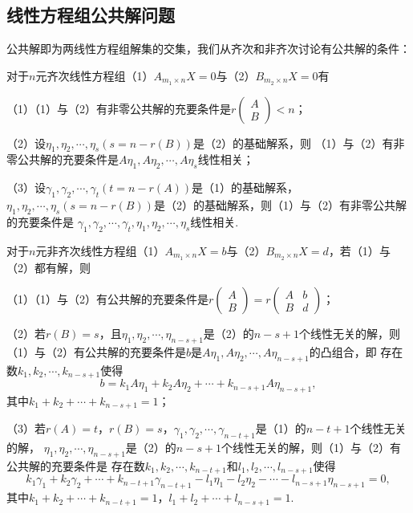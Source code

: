 \subsection{线性方程组公共解问题}
公共解即为两线性方程组解集的交集，我们从齐次和非齐次讨论有公共解的条件：
\begin{theorem}
	对于$n$元齐次线性方程组\textup{（1）}$A_{m_1 \times n}X=0$与\textup{（2）}$B_{m_2 \times n}X=0$有

	\textup{（1）}\textup{（1）}与\textup{（2）}有非零公共解的充要条件是$r\begin{pmatrix}
			A \\ B
		\end{pmatrix}<n$\textup{；}

	\textup{（2）}设$\eta_1,\eta_2,\cdots,\eta_s(s=n-r(B))$是\textup{（2）}的基础解系，则
	\textup{（1）}与\textup{（2）}有非零公共解的充要条件是$A\eta_1,A\eta_2,\cdots,A\eta_s$线性相关\textup{；}

	\textup{（3）}设$\gamma_1,\gamma_2,\cdots,\gamma_t(t=n-r(A))$是\textup{（1）}的基础解系，
	$\eta_1,\eta_2,\cdots,\eta_s(s=n-r(B))$是\textup{（2）}的基础解系，则\textup{（1）}与\textup{（2）}有非零公共解的充要条件是
	$\gamma_1,\gamma_2,\cdots,\gamma_t,\eta_1,\eta_2,\cdots,\eta_s$线性相关.
\end{theorem}
\begin{theorem}
	对于$n$元非齐次线性方程组\textup{（1）}$A_{m_1 \times n}X=b$与\textup{（2）}$B_{m_2 \times n}X=d$，若\textup{（1）}与\textup{（2）}都有解，则

	\textup{（1）}\textup{（1）}与\textup{（2）}有公共解的充要条件是$r\begin{pmatrix}
			A \\ B
		\end{pmatrix}=r\begin{pmatrix}
			A & b \\ B & d
		\end{pmatrix}$\textup{；}

	\textup{（2）}若$r(B)=s$，且$\eta_1,\eta_2,\cdots,\eta_{n-s+1}$是\textup{（2）}的$n-s+1$个线性无关的解，则
	\textup{（1）}与\textup{（2）}有公共解的充要条件是$b$是$A\eta_1,A\eta_2,\cdots,A\eta_{n-s+1}$的凸组合，即
	存在数$k_1,k_2,\cdots,k_{n-s+1}$使得
	$$b=k_1A\eta_1+k_2A\eta_2+\cdots+k_{n-s+1}A\eta_{n-s+1},$$
	其中$k_1+k_2+\cdots+k_{n-s+1}=1$\textup{；}
	
	\textup{（3）}若$r(A)=t$，$r(B)=s$，$\gamma_1,\gamma_2,\cdots,\gamma_{n-t+1}$是\textup{（1）}的$n-t+1$个线性无关的解，
	$\eta_1,\eta_2,\cdots,\eta_{n-s+1}$是\textup{（2）}的$n-s+1$个线性无关的解，则\textup{（1）}与\textup{（2）}有公共解的充要条件是
	存在数$k_1,k_2,\cdots,k_{n-t+1}$和$l_1,l_2,\cdots,l_{n-s+1}$使得
	$$k_1\gamma_1+k_2\gamma_2+\cdots+k_{n-t+1}\gamma_{n-t+1}-l_1\eta_1-l_2\eta_2-\cdots-l_{n-s+1}\eta_{n-s+1}=0,$$
	其中$k_1+k_2+\cdots+k_{n-t+1}=1$，$l_1+l_2+\cdots+l_{n-s+1}=1$.
\end{theorem}
